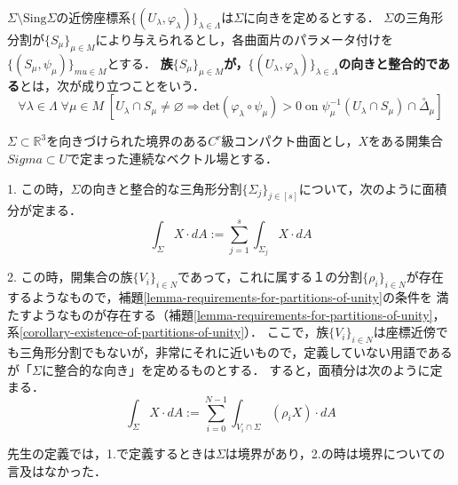 \documentclass[uplatex, dvipdfmx]{jsreport}
\begin{document}
\begin{definition}[整合的な向きを定める座標近傍と三角形分割]
    $\Sigma\setminus\mathrm{Sing}\Sigma$の近傍座標系$\{(U_\lambda,\varphi_\lambda)\}_{\lambda\in\Lambda}$は$\Sigma$に向きを定めるとする．
    $\Sigma$の三角形分割が$\{S_\mu\}_{\mu\in M}$により与えられるとし，各曲面片のパラメータ付けを$\{(S_\mu,\psi_\mu)\}_{mu\in M}$とする．
    \textbf{族$\{S_\mu\}_{\mu\in M}$が，$\{(U_\lambda,\varphi_\lambda)\}_{\lambda\in\Lambda}$の向きと整合的である}とは，次が成り立つことをいう．
    \[ \forall\lambda\in\Lambda\;\forall\mu\in M\;\left[ U_\lambda\cap S_\mu\ne\varnothing\Rightarrow\mathrm{det}(\varphi_\lambda\circ\psi_\mu)>0\;\mathrm{on}\;\psi_\mu^{-1}(U_\lambda\cap S_\mu)\cap\overset{\circ}{\Delta}_\mu\right] \]
    \begin{center}
    \end{center}
\end{definition}

\begin{shadebox}
    \begin{definition}
        $\Sigma\subset\mathbb{R}^3$を向きづけられた境界のある$C^r$級コンパクト曲面とし，$X$をある開集合$Sigma\subset U$で定まった連続なベクトル場とする．

        1. この時，$\Sigma$の向きと整合的な三角形分割$\{\Sigma_j\}_{j\in[s]}$について，次のように面積分が定まる．
        \[ \int_\Sigma X\cdot dA:=\sum^s_{j=1}\int_{\Sigma_j}X\cdot dA \]

        2. この時，開集合の族$\{V_i\}_{i\in N}$であって，これに属する１の分割$\{\rho_i\}_{i\in N}$が存在するようなもので，補題\ref{lemma-requirements-for-partitions-of-unity}の条件を
        満たすようなものが存在する（補題\ref{lemma-requirements-for-partitions-of-unity}，系\ref{corollary-existence-of-partitions-of-unity}）．
        ここで，族$\{V_i\}_{i\in N}$は座標近傍でも三角形分割でもないが，非常にそれに近いもので，定義していない用語であるが「$\Sigma$に整合的な向き」を定めるものとする．
        すると，面積分は次のように定まる．
        \[\int_\Sigma X\cdot dA:=\sum^{N-1}_{i=0}\int_{V_i\cap\Sigma}(\rho_iX)\cdot dA\]
    \end{definition}
\end{shadebox}
\begin{remark}
    先生の定義では，1.で定義するときは$\Sigma$は境界があり，2.の時は境界についての言及はなかった．
\end{remark}
\end{document}
